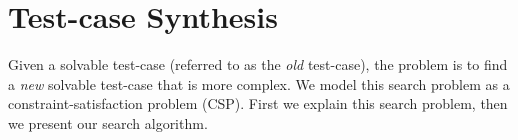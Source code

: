 \section{Test-case Synthesis}
Given a solvable test-case (referred to as the \emph{old} test-case), the problem is to find a \emph{new} solvable test-case that is more complex.
%
We model this search problem as a constraint-satisfaction problem (CSP).
%
First we explain this search problem, then we present our search algorithm.




